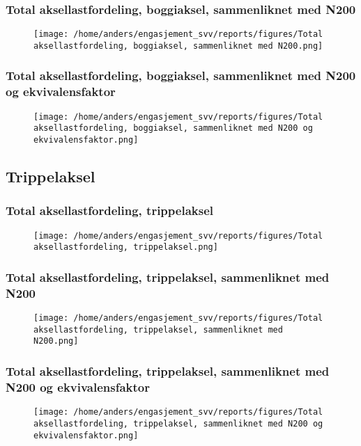 \documentclass{article}
\begin{document}
\subsubsection{Total aksellastfordeling, boggiaksel, sammenliknet med N200}
\begin{figure}[H]
\centering
\texttt{[image: /home/anders/engasjement\_svv/reports/figures/Total aksellastfordeling, boggiaksel, sammenliknet med N200.png]}
\end{figure}
\subsubsection{Total aksellastfordeling, boggiaksel, sammenliknet med N200 og ekvivalensfaktor}
\begin{figure}[H]
\centering
\texttt{[image: /home/anders/engasjement\_svv/reports/figures/Total aksellastfordeling, boggiaksel, sammenliknet med N200 og ekvivalensfaktor.png]}
\end{figure}
\subsection{Trippelaksel}
\subsubsection{Total aksellastfordeling, trippelaksel}
\begin{figure}[H]
\centering
\texttt{[image: /home/anders/engasjement\_svv/reports/figures/Total aksellastfordeling, trippelaksel.png]}
\end{figure}
\subsubsection{Total aksellastfordeling, trippelaksel, sammenliknet med N200}
\begin{figure}[H]
\centering
\texttt{[image: /home/anders/engasjement\_svv/reports/figures/Total aksellastfordeling, trippelaksel, sammenliknet med N200.png]}
\end{figure}
\subsubsection{Total aksellastfordeling, trippelaksel, sammenliknet med N200 og ekvivalensfaktor}
\begin{figure}[H]
\centering
\texttt{[image: /home/anders/engasjement\_svv/reports/figures/Total aksellastfordeling, trippelaksel, sammenliknet med N200 og ekvivalensfaktor.png]}
\end{figure}
\end{document}
